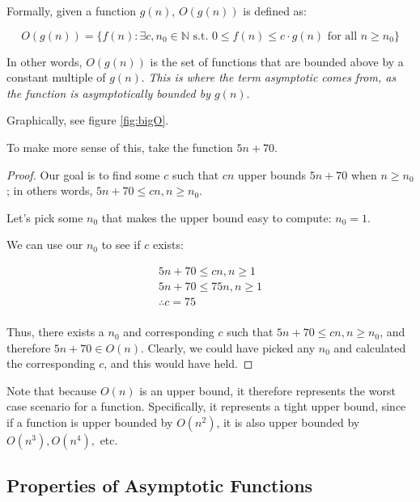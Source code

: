 \documentclass[12pt]{article}
\begin{document}
Formally, given a function $g(n)$, $O(g(n))$ is defined as:

\begin{equation}
    O(g(n)) = \{f(n): \exists c, n_0 \in \mathbb{N} \text{ s.t. } 0 \leq f(n) \leq c \cdot g(n) \text{ for all } n \geq n_0\}
\end{equation}

In other words, $O(g(n))$ is the set of functions that are bounded above by a constant multiple of $g(n)$. \textit{This is where the term asymptotic comes from, as the function is asymptotically bounded by $g(n)$}.

Graphically, see figure \ref{fig:bigO}.


To make more sense of this, take the function $5n+70$. 

\begin{proof}
    Our goal is to find some $c$ such that $cn$ upper bounds $5n+70$ when $n\geq n_0$; in others words, $5n+70 \leq cn, n \geq n_0$.

    Let's pick some $n_0$ that makes the upper bound easy to compute: $n_0 = 1$. 
    
    We can use our $n_0$ to see if $c$ exists:

    \begin{equation}
        \begin{split}
            5n + 70 \leq cn, n \geq 1 \\
            5n + 70 \leq 75n, n \geq 1 \\
            \therefore c = 75\\
        \end{split}
    \end{equation}

    Thus, there exists a $n_0$ and corresponding $c$ such that $5n+70 \leq cn, n \geq n_0$, and therefore $5n+70 \in O(n)$. Clearly, we could have picked any $n_0$ and calculated the corresponding $c$, and this would have held.
\end{proof}

Note that because $O(n)$ is an upper bound, it therefore represents the worst case scenario for a function. Specifically, it represents a tight upper bound, since if a function is upper bounded by $O(n^2)$, it is also upper bounded by $O(n^3), O(n^4),$ etc.

\subsection{Properties of Asymptotic Functions}
\end{document}
